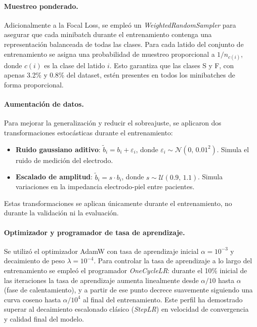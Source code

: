 \paragraph{Muestreo ponderado.}
Adicionalmente a la Focal Loss, se empleó un \textit{WeightedRandomSampler} para asegurar que cada minibatch durante el entrenamiento contenga una representación balanceada de todas las clases. Para cada latido del conjunto de entrenamiento se asigna una probabilidad de muestreo proporcional a $1/n_{c(i)}$, donde $c(i)$ es la clase del latido $i$. Esto garantiza que las clases S y F, con apenas 3.2\% y 0.8\% del dataset, estén presentes en todos los minibatches de forma proporcional.

\paragraph{Aumentación de datos.}
Para mejorar la generalización y reducir el sobreajuste, se aplicaron dos transformaciones estocásticas durante el entrenamiento:
\begin{itemize}
\item \textbf{Ruido gaussiano aditivo}: $\tilde{b}_i = b_i + \varepsilon_i$, donde $\varepsilon_i \sim \mathcal{N}(0,\,0.01^2)$. Simula el ruido de medición del electrodo.
\item \textbf{Escalado de amplitud}: $\tilde{b}_i = s \cdot b_i$, donde $s \sim \mathcal{U}(0.9,\,1.1)$. Simula variaciones en la impedancia electrodo-piel entre pacientes.
\end{itemize}

Estas transformaciones se aplican únicamente durante el entrenamiento, no durante la validación ni la evaluación.

\paragraph{Optimizador y programador de tasa de aprendizaje.}
Se utilizó el optimizador AdamW \cite{Loshchilov2019} con tasa de aprendizaje inicial $\alpha = 10^{-3}$ y decaimiento de peso $\lambda = 10^{-4}$. Para controlar la tasa de aprendizaje a lo largo del entrenamiento se empleó el programador \textit{OneCycleLR}: durante el 10\% inicial de las iteraciones la tasa de aprendizaje aumenta linealmente desde $\alpha/10$ hasta $\alpha$ (fase de calentamiento), y a partir de ese punto decrece suavemente siguiendo una curva coseno hasta $\alpha/10^4$ al final del entrenamiento. Este perfil ha demostrado superar al decaimiento escalonado clásico (\textit{StepLR}) en velocidad de convergencia y calidad final del modelo.

